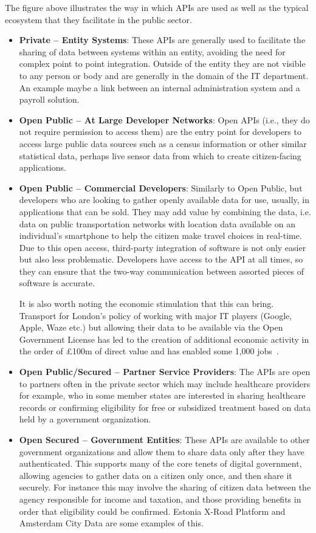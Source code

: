 The figure above illustrates the way in which APIs are used as well as the typical
ecosystem that they facilitate in the public sector.
\begin{itemize}
	\item \textbf{Private – Entity Systems}: These APIs are generally used to facilitate
	 the sharing of data between systems within an entity, avoiding the need
	 for complex point to point integration. Outside of the entity they are not visible
	 to any person or body and are generally in the domain of the IT
	 department. An example maybe a link between an internal administration system and a payroll solution.
	 \item \textbf{Open Public – At Large Developer Networks}: Open APIs (i.e., they do
	 not require permission to access them) are the entry point for developers
	 to access large public data sources such as a census information or other
	 similar statistical data, perhaps live sensor data from which to create
	 citizen-facing applications.
	 \item \textbf{Open Public – Commercial Developers}: Similarly to Open Public,
	 but developers who are
	 looking to gather openly available data for use, usually, in applications
	 that can be sold. They may add value by combining the data, i.e.
	 data on public transportation networks with location data available on an
	 individual’s smartphone to help the citizen make travel choices in real-time.
	 Due to this open access, third-party integration of software is not only easier
	 but also less problematic. Developers have access to the API at all times, so they can ensure that the two-way communication between assorted pieces of software is accurate.
	 
	 It is also worth noting the economic stimulation that this can bring. Transport
	 for London’s policy of working with major IT players (Google, Apple, Waze etc.)
	 but allowing their data to be available via the Open Government License has led
	 to the creation of additional economic activity in the order of £100m of direct
	 value and has enabled some 1,000 jobs~\citep{api_industrial_data}.
	 \item \textbf{Open Public/Secured – Partner Service Providers}: The APIs are open to
	 partners often in the private sector which may include healthcare providers
	 for example, who in some member states are interested in sharing healthcare
	 records or confirming eligibility for free or subsidized treatment based on
	 data held by a government organization.
	 \item \textbf{Open Secured – Government Entities}: These APIs are available to other
	 government organizations and allow them to share data only after they have
	 authenticated. This supports many of the core tenets of digital government,
	 allowing agencies to gather data on a citizen only once, and then share it
	 securely. For instance this may involve the sharing of citizen data between
	 the agency responsible for income and taxation, and those providing benefits in
	 order that eligibility could be confirmed. Estonia X-Road Platform and Amsterdam
	 City Data are some examples of this.
	 

\end{itemize}
